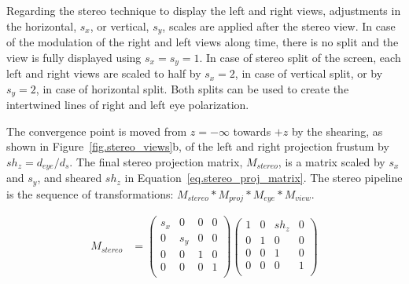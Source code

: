 Regarding the stereo technique to display the left and right views, adjustments in the horizontal, $s_x$, or vertical, $s_y$, scales are applied after the stereo view. In case of the modulation of the right and left views along time, there is no split and the view is fully displayed using  $s_x = s_y = 1$. In case of stereo split of the screen, each left and right views are scaled to half by $s_x = 2$, in case of vertical split, or by $s_y = 2$, in case of horizontal split. Both splits can be used to create the intertwined lines of right and left eye polarization.  

The convergence point is moved from $z=-\infty$ towards $+z$ by the shearing, as shown in Figure~\ref{fig.stereo_views}b, of the left and right projection frustum by $sh_z = d_{eye}/d_{s}$. The final stereo projection matrix, $M_{stereo}$, is a matrix scaled by $s_x$ and $s_y$, and sheared $sh_z$ in Equation~\ref{eq.stereo_proj_matrix}. The stereo pipeline is the sequence of transformations: $M_{stereo}*M_{proj}*M_{eye}*M_{view}$.

\begin{equation}
\begin{aligned}
M_{stereo} &= 
\begin{pmatrix} 
s_x & 0 & 0 & 0\\
0 & s_y & 0 & 0\\
0 & 0   & 1 & 0\\
0 & 0   & 0 & 1\\
\end{pmatrix}
\begin{pmatrix} 
1 & 0 & sh_z & 0\\
0 & 1 & 0 & 0\\
0 & 0 & 1 & 0\\
0 & 0 & 0 & 1\\
\end{pmatrix}
\end{aligned}
\label{eq.stereo_proj_matrix}
\end{equation}

 